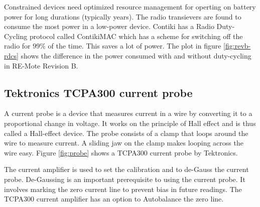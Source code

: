 \documentclass[a4paper]{article}
\begin{document}
Constrained devices need optimized resource management for operting on battery power for long durations (typically years). The radio transievers are found to consume the most power in a low-power device. Contiki has a Radio Duty-Cycling protocol called ContikiMAC \cite{contikimac} which has a scheme for switching off the radio for $99\%$ of the time. This saves a lot of power. The plot in figure \ref{fig:revb-rdcs} shows the difference in the power consumed with and without duty-cycling in RE-Mote Revision B.


\subsection{Tektronics TCPA300 current probe}
A current probe is a device that measures current in a wire by converting it to a proportional change in voltage. It works on the principle of Hall effect and is thus called a Hall-effect device. The probe consists of a clamp that loops around the wire to measure current. A sliding jaw on the clamp makes looping across the wire easy. Figure \ref{fig:probe} shows a TCPA300 current probe by Tektronics. 

The current amplifier is used to set the calibration and to de-Gauss the current probe. De-Gaussing is an important prerequisite to using the current probe. It involves marking the zero current line to prevent bias in future readings. The TCPA300 current amplifier has an option to Autobalance the zero line.
\end{document}
